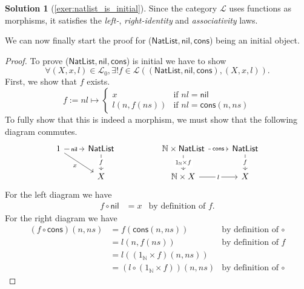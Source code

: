 \documentclass[a4paper,11pt, oneside,titlepage=false]{scrbook}
\theoremstyle{plain}
\theoremstyle{definition}
\newtheorem{solution}[thm]{Solution}
\newcommand{\Cat}[1]{\mathcal{#1}}
\newcommand{\nil}{\ensuremath{\mathsf{nil}}}
\newcommand{\cons}{\ensuremath{\mathsf{cons}}}
\newcommand{\NN}{\ensuremath{\mathbb{N}}}
\begin{document}
\begin{solution}[\cref{exer:natlist_is_initial}]
		Since the category $\Cat{L}$ uses functions as morphisms,
		it satisfies the \textit{left-}, \textit{right-identity} and \textit{associativity} laws.

		We can now finally start the proof for ($\mathsf{NatList}, \nil, \cons$) being an initial object.

		\begin{proof}
			To prove ($\mathsf{NatList}, \nil, \cons$) is initial we have to show
			\[
				\forall (X, x, l) \in \Cat{L}_0, \exists! f \in \Cat{L}((\mathsf{NatList}, \nil, \cons), (X, x, l)).
			\]
			First, we show that $f$ exists.
			\[
				f := nl \mapsto \begin{cases}
          x             & \text{if $nl = \nil$ }             \\
					l (n, f (ns)) & \text{if $nl = \cons (n, ns)$}
				\end{cases}
			\]
			To fully show that this is indeed a morphism, we must show that the following diagram commutes.
			\[
				\begin{tikzcd}
					1 & \mathsf{NatList} && {\NN \times \mathsf{NatList}} & \mathsf{NatList} \\
					& {X} && {\NN \times X} & {X}
          \arrow["{\nil}"{description}, from=1-1, to=1-2]
					\arrow["x"', from=1-1, to=2-2]
					\arrow["f"{description}, from=1-2, to=2-2]
          \arrow["{\cons}"{description}, from=1-4, to=1-5]
					\arrow["l"{description}, from=2-4, to=2-5]
					\arrow["f"{description}, from=1-5, to=2-5]
					\arrow["{1_\NN \times f}"{description}, from=1-4, to=2-4]
				\end{tikzcd}
			\]
			For the left diagram we have
			\begin{align*}
				f \circ \nil & = x & \text{by definition of $f$}.
			\end{align*}
			For the right diagram we have
			\begin{align*}
				(f \circ \cons) (n, ns) & = f (\cons (n, ns))                 & \text{by definition of $\circ$} \\
				                                & = l (n, f(ns))                              & \text{by definition of $f$}     \\
				                                & = l ((1_\NN \times f) (n, ns))       &                                 \\
				                                & = (l \circ (1_\NN \times f)) (n, ns) & \text{by definition of $\circ$}
			\end{align*}


\end{proof}
\end{solution}
\end{document}
